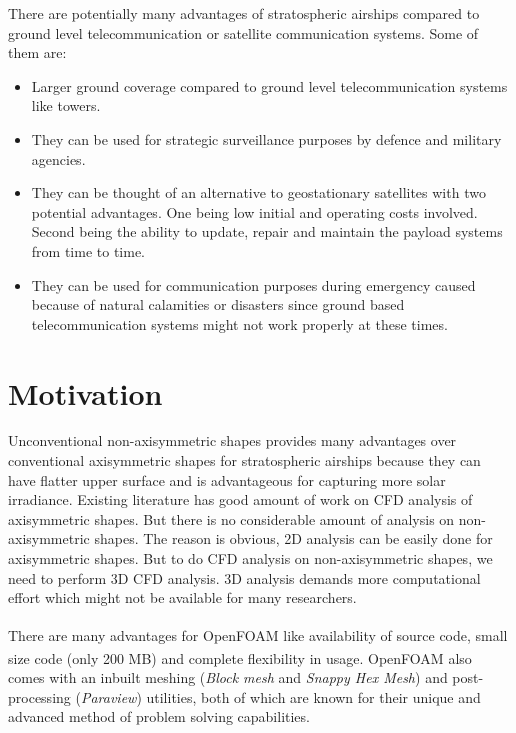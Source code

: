  There are potentially many advantages of stratospheric airships compared to ground level telecommunication or satellite communication systems. Some of them are:
 
 \begin{itemize}
 	\item Larger ground coverage compared to ground level telecommunication systems like towers.
 	\item They can be used for strategic surveillance purposes by defence and military agencies.
 	\item They can be thought of an alternative to geostationary satellites with two potential advantages. One being low initial and operating costs involved. Second being the ability to update, repair and maintain the payload systems from time to time.
 	\item They can be used for communication purposes during emergency caused because of natural calamities or disasters since ground based telecommunication systems might not work properly at these times.
 \end{itemize}
 
\section{Motivation}

Unconventional non-axisymmetric shapes provides many advantages over conventional axisymmetric shapes for stratospheric airships because they can have flatter upper surface and is advantageous for capturing more solar irradiance. Existing literature has good amount of work on CFD analysis of axisymmetric shapes. But there is no considerable amount of analysis on non-axisymmetric shapes. The reason is obvious, 2D analysis can be easily done for axisymmetric shapes. But to do CFD analysis on non-axisymmetric shapes, we need to perform 3D CFD analysis. 3D analysis demands more computational effort which might not be available for many researchers.

There are many advantages for OpenFOAM\textsuperscript{\textregistered} like availability of source code, small size code (only 200 MB) and complete flexibility in usage. OpenFOAM\textsuperscript{\textregistered} also comes with an inbuilt meshing (\textit{Block mesh} and \textit{Snappy Hex Mesh}) and post-processing (\textit{Paraview}) utilities, both of which are known for their unique and advanced method of problem solving capabilities. \\

